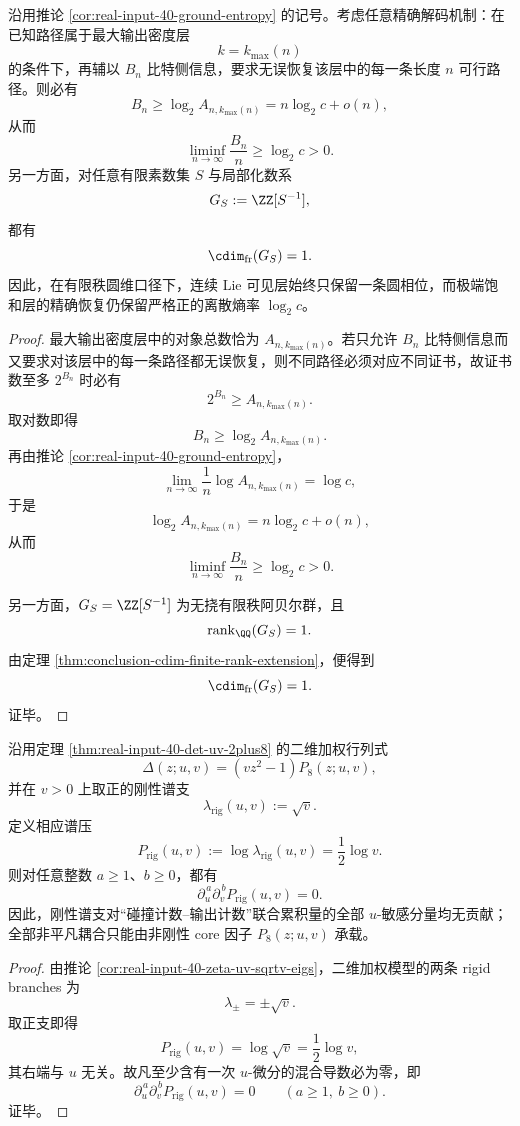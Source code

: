 \begin{theorem}\label{thm:conclusion-one-circle-visible-phase-positive-ground-entropy-separation}
沿用推论 \ref{cor:real-input-40-ground-entropy} 的记号。考虑任意精确解码机制：在已知路径属于最大输出密度层
\[
k=k_{\max}(n)
\]
的条件下，再辅以 \(B_n\) 比特侧信息，要求无误恢复该层中的每一条长度 \(n\) 可行路径。则必有
\[
B_n\ge \log_2 A_{n,k_{\max}(n)}
=
n\log_2 c+o(n),
\]
从而
\[
\liminf_{n\to\infty}\frac{B_n}{n}\ge \log_2 c>0.
\]
另一方面，对任意有限素数集 \(S\) 与局部化数系
\[
G_S:=\ZZ[S^{-1}],
\]
都有
\[
\cdim_{\mathrm{fr}}(G_S)=1.
\]
因此，在有限秩圆维口径下，连续 Lie 可见层始终只保留一条圆相位，而极端饱和层的精确恢复仍保留严格正的离散熵率 \(\log_2 c\)。
\end{theorem}
\begin{proof}
最大输出密度层中的对象总数恰为 \(A_{n,k_{\max}(n)}\)。若只允许 \(B_n\) 比特侧信息而又要求对该层中的每一条路径都无误恢复，则不同路径必须对应不同证书，故证书数至多 \(2^{B_n}\) 时必有
\[
2^{B_n}\ge A_{n,k_{\max}(n)}.
\]
取对数即得
\[
B_n\ge \log_2 A_{n,k_{\max}(n)}.
\]
再由推论 \ref{cor:real-input-40-ground-entropy}，
\[
\lim_{n\to\infty}\frac{1}{n}\log A_{n,k_{\max}(n)}=\log c,
\]
于是
\[
\log_2 A_{n,k_{\max}(n)}=n\log_2 c+o(n),
\]
从而
\[
\liminf_{n\to\infty}\frac{B_n}{n}\ge \log_2 c>0.
\]

另一方面，\(G_S=\ZZ[S^{-1}]\) 为无挠有限秩阿贝尔群，且
\[
\operatorname{rank}_{\QQ}(G_S)=1.
\]
由定理 \ref{thm:conclusion-cdim-finite-rank-extension}，便得到
\[
\cdim_{\mathrm{fr}}(G_S)=1.
\]
证毕。
\end{proof}

\begin{proposition}\label{prop:conclusion-rigid-orthogonal-slice-collision-output-spectrum}
沿用定理 \ref{thm:real-input-40-det-uv-2plus8} 的二维加权行列式
\[
\Delta(z;u,v)=(vz^2-1)P_8(z;u,v),
\]
并在 \(v>0\) 上取正的刚性谱支
\[
\lambda_{\mathrm{rig}}(u,v):=\sqrt v.
\]
定义相应谱压
\[
P_{\mathrm{rig}}(u,v):=\log\lambda_{\mathrm{rig}}(u,v)=\frac12\log v.
\]
则对任意整数 \(a\ge 1\)、\(b\ge 0\)，都有
\[
\partial_u^{\,a}\partial_v^{\,b}P_{\mathrm{rig}}(u,v)=0.
\]
因此，刚性谱支对“碰撞计数--输出计数”联合累积量的全部 \(u\)-敏感分量均无贡献；全部非平凡耦合只能由非刚性 core 因子 \(P_8(z;u,v)\) 承载。
\end{proposition}
\begin{proof}
由推论 \ref{cor:real-input-40-zeta-uv-sqrtv-eigs}，二维加权模型的两条 rigid branches 为
\[
\lambda_\pm=\pm\sqrt v.
\]
取正支即得
\[
P_{\mathrm{rig}}(u,v)=\log\sqrt v=\frac12\log v,
\]
其右端与 \(u\) 无关。故凡至少含有一次 \(u\)-微分的混合导数必为零，即
\[
\partial_u^{\,a}\partial_v^{\,b}P_{\mathrm{rig}}(u,v)=0
\qquad (a\ge 1,\ b\ge 0).
\]
证毕。
\end{proof}

